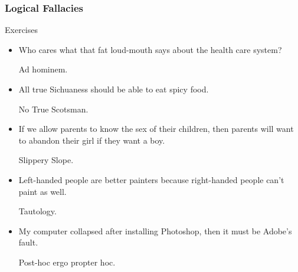 \documentclass{beamer}
\begin{document}
\begin{frame}
\frametitle{Logical Fallacies}
\begin{block}{Exercises}
\begin{itemize}
\item Who cares what that fat loud-mouth says about the health care system? 

\textcolor{answer}{Ad hominem.}
\item All true Sichuaness should be able to eat spicy food. 

\textcolor{answer}{No True Scotsman.}
\item If we allow parents to know the sex of their children, then parents will want to abandon their girl if they want a boy.

\textcolor{answer}{Slippery Slope.}
\item Left-handed people are better painters because right-handed people can't paint as well.

\textcolor{answer}{Tautology.}
\item My computer collapsed after installing Photoshop, then it must be Adobe's fault.

\textcolor{answer}{Post-hoc ergo propter hoc.}
\end{itemize}
\end{block}
\end{frame}
\end{document}
